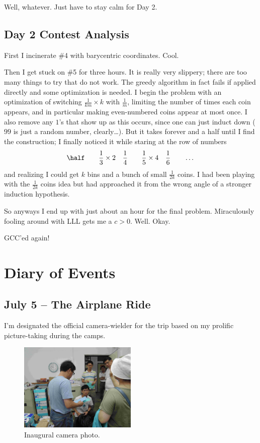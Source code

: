 \documentclass[11pt]{scrreprt}
\numberwithin{figure}{chapter}
\begin{document}
Well, whatever. Just have to stay calm for Day 2.

\section{Day 2 Contest Analysis}
First I incinerate \#4 with barycentric coordinates.  Cool.

Then I get stuck on \#5 for three hours. It is really very slippery; there are too many things to try that do not work.
The greedy algorithm in fact fails if applied directly and some optimization is needed.
I begin the problem with an optimization of switching $\frac{1}{km} \times k$ with $\frac{1}{m}$, limiting the number of times each coin appears,
and in particular making even-numbered coins appear at most once.
I also remove any $1$'s that show up as this occurs, since one can just induct down ($99$ is just a random number, clearly\dots).
But it takes forever and a half until I find the construction; I finally noticed it while staring at the row of numbers
\[ \half \qquad \frac 13 \times 2 \quad \frac 14 \qquad \frac 15 \times 4 \quad \frac 1 6 \qquad \dots \]
and realizing I could get $k$ bins and a bunch of small $\frac{1}{2k}$ coins.
I had been playing with the $\frac{1}{2k}$ coins idea but had approached it from the wrong angle of a stronger induction hypothesis.

So anyways I end up with just about an hour for the final problem.
Miraculously fooling around with LLL gets me a $c>0$. Well. Okay.

GCC'ed again!

\chapter{Diary of Events}
\section{July 5 -- The Airplane Ride}
I'm designated the official camera-wielder for the trip based on my prolific picture-taking during the camps.

\begin{figure}[ht]
  \centering
  \includegraphics[width=0.5\textwidth]{media/first.jpg}
  \caption{Inaugural camera photo.}
\end{figure}
\end{document}
